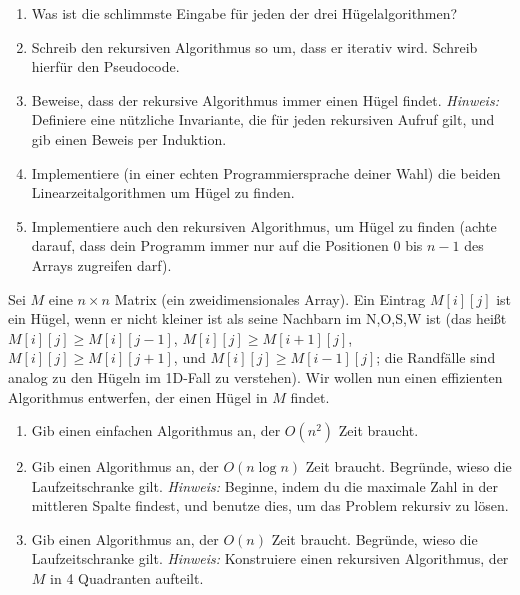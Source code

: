 \documentclass{uebung_cs}
\begin{document}
\begin{aufgabe}\label{thu-last}\mbox{}
	\begin{enumerate}
		\item Was ist die schlimmste Eingabe für jeden der drei Hügelalgorithmen?
		\item Schreib den rekursiven Algorithmus so um, dass er iterativ wird. Schreib hierfür den Pseudocode.
		\item Beweise, dass der rekursive Algorithmus immer einen Hügel findet. \emph{Hinweis:} Definiere eine nützliche Invariante, die für jeden rekursiven Aufruf gilt, und gib einen Beweis per Induktion.
		\item Implementiere (in einer echten Programmiersprache deiner Wahl) die beiden Linearzeitalgorithmen um Hügel zu finden.
		\item Implementiere auch den rekursiven Algorithmus, um Hügel zu finden (achte darauf, dass dein Programm immer nur auf die Positionen $0$ bis $n-1$ des Arrays zugreifen darf).
	\end{enumerate}
\end{aufgabe}

\begin{aufgabe}
	Sei $M$ eine $n\times n$ Matrix (ein zweidimensionales Array).
	Ein Eintrag $M[i][j]$ ist ein Hügel, wenn er nicht kleiner ist als seine Nachbarn im N,O,S,W ist (das heißt $M[i][j]\ge M[i][j-1]$, $M[i][j]\ge M[i+1][j]$, $M[i][j]\ge M[i][j+1]$, und $M[i][j]\ge M[i-1][j]$; die Randfälle sind analog zu den Hügeln im 1D-Fall zu verstehen).
	Wir wollen nun einen effizienten Algorithmus entwerfen, der einen Hügel in $M$ findet.
	\begin{enumerate}
		\item \bestehen Gib einen einfachen Algorithmus an, der $O(n^2)$ Zeit braucht.
		\item \mittel Gib einen Algorithmus an, der $O(n \log n)$ Zeit braucht. Begründe, wieso die Laufzeitschranke gilt. \emph{Hinweis:} Beginne, indem du die maximale Zahl in der mittleren Spalte findest, und benutze dies, um das Problem rekursiv zu lösen.
		\item \note Gib einen Algorithmus an, der $O(n)$ Zeit braucht. Begründe, wieso die Laufzeitschranke gilt. \emph{Hinweis:} Konstruiere einen rekursiven Algorithmus, der $M$ in 4 Quadranten aufteilt.
	\end{enumerate}
\end{aufgabe}
\end{document}
